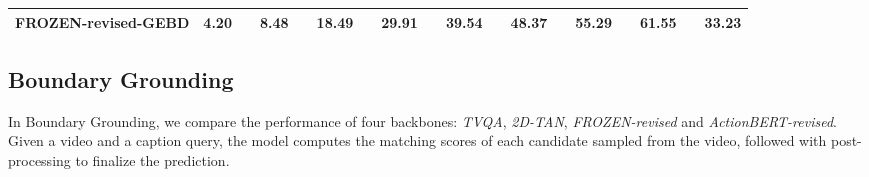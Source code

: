 \documentclass[runningheads]{llncs}
\begin{document}
\begin{table}[t]
\begin{center}
{\begin{tabular}{l|clclclclclclclclc}
FROZEN-revised-GEBD             & 4.20          & \textbf{} & 8.48          & \textbf{} & \textbf{18.49} & \textbf{} & 29.91          & \textbf{} & 39.54          & \textbf{} & \textbf{48.37} & \textbf{} & \textbf{55.29} & \textbf{} & \textbf{61.55} &  & 33.23          \\ \hline
\end{tabular}
}
\end{center}
\end{table} \begin{table}[t]
\begin{center}
\caption{Performance comparison of different methods in Boundary Caption-Video Retrieval. For \textit{FROZEN-revised}, we add another group without difference modeling}
\label{table:retrieval_sota}
\end{center}
\end{table} \subsection{Boundary Grounding}
In Boundary Grounding, we compare the performance of four backbones: \textit{TVQA}, \textit{2D-TAN}, \textit{FROZEN-revised} and \textit{ActionBERT-revised}. Given a video and a caption query, the model computes the matching scores of each candidate sampled from the video, followed with post-processing to finalize the prediction.
\end{document}
